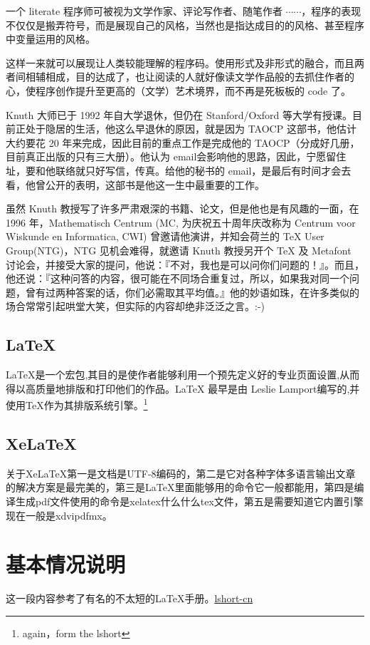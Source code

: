 \documentclass[12pt,oneside]{book}
\begin{document}
\begin{common-format}
一个 literate 程序师可被视为文学作家、评论写作者、随笔作者 $ \cdots\cdots$，程序的表现不仅仅是搬弄符号，而是展现自己的风格，当然也是指达成目的的风格、甚至程序中变量运用的风格。

这样一来就可以展现让人类较能理解的程序码。使用形式及非形式的融合，而且两者间相辅相成，目的达成了，也让阅读的人就好像读文学作品般的去抓住作者的心，使程序创作提升至更高的（文学）艺术境界，而不再是死板板的 code 了。

Knuth 大师已于 1992 年自大学退休，但仍在 Stanford/Oxford 等大学有授课。目前正处于隐居的生活，他这么早退休的原因，就是因为 TAOCP 这部书，他估计大约要花 20 年来完成，因此目前的重点工作是完成他的 TAOCP（分成好几册，目前真正出版的只有三大册）。他认为 email会影响他的思路，因此，宁愿留住址，要和他联络就只好写信，传真。给他的秘书的 email，是最后有时间才会去看，他曾公开的表明，这部书是他这一生中最重要的工作。

虽然 Knuth 教授写了许多严肃艰深的书籍、论文，但是他也是有风趣的一面，在 1996 年，Mathematisch Centrum (MC, 为庆祝五十周年庆改称为 Centrum voor Wiskunde en Informatica, CWI) 曾邀请他演讲，并知会荷兰的 TeX User Group(NTG)，NTG 见机会难得，就邀请 Knuth 教授另开个 TeX 及 Metafont 讨论会，并接受大家的提问，他说：『不对，我也是可以问你们问题的！』。而且，他还说：『这种问答的内容，很可能在不同场合重复过，所以，如果我对同一个问题，曾有过两种答案的话，你们必需取其平均值。』他的妙语如珠，在许多类似的场合常常引起哄堂大笑，但实际的内容却绝非泛泛之言。:-)

\subsection{LaTeX}
LaTeX是一个宏包,其目的是使作者能够利用一个预先定义好的专业页面设置,从而得以高质量地排版和打印他们的作品。LaTeX 最早是由 Leslie Lamport编写的,并使用\TeX 作为其排版系统引擎。\footnote{again，form the lshort}

\subsection{XeLaTeX}
关于XeLaTeX第一是文档是UTF-8编码的，第二是它对各种字体多语言输出文章的解决方案是最完美的，第三是LaTeX里面能够用的命令它一般都能用，第四是编译生成pdf文件使用的命令是xelatex什么什么tex文件，第五是需要知道它内置引擎现在一般是xdvipdfmx。


\section{基本情况说明}
这一段内容参考了有名的不太短的LaTeX手册。\href{http://www.ctan.org/pkg/lshort-zh-cn}{lshort-cn}


\end{common-format}
\end{document}
